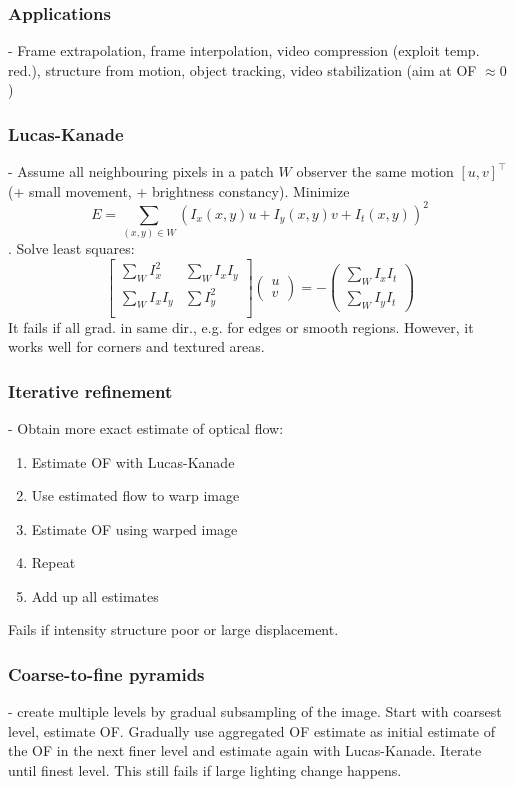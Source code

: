 \documentclass[a4paper,10pt]{article}
\begin{document}
\subsubsection{Applications} - Frame extrapolation, frame interpolation, video compression (exploit temp. red.), structure from motion, object tracking, video stabilization (aim at OF \( \approx 0 \))
\subsubsection{Lucas-Kanade} - Assume all neighbouring pixels in a patch \( W \) observer the same motion \( \left[ u,v \right]^\top \) (+ small movement, + brightness constancy). Minimize \[ E = \sum_{(x,y)\in W} (I_x(x,y)u + I_y(x,y)v + I_t(x,y))^2 \]. Solve least squares:
    \[
	\left[
	\begin{smallmatrix} 
	    \sum_W I^2_x & \sum_W I_x I_y \\
	    \sum_W I_x I_y & \sum I^2_y \\
	\end{smallmatrix}
	\right]
	\left(
	    \begin{smallmatrix}
		u \\ v
	    \end{smallmatrix}
	\right)
	= -
	\left(
	\begin{smallmatrix}
	    \sum_W I_x I_t \\
	    \sum_W I_y I_t
	\end{smallmatrix}
	\right)
    \] 
It fails if all grad. in same dir., e.g. for edges or smooth regions. However, it works well for corners and textured areas.
\subsubsection{Iterative refinement} - Obtain more exact estimate of optical flow:
    \begin{enumerate}
	\item Estimate OF with Lucas-Kanade
	\item Use estimated flow to warp image
	\item Estimate OF using warped image
	\item Repeat
	\item Add up all estimates
    \end{enumerate}
    Fails if intensity structure poor or large displacement.
\subsubsection{Coarse-to-fine pyramids} - create multiple levels by gradual subsampling of the image. Start with coarsest level, estimate OF. Gradually use aggregated OF estimate as initial estimate of the OF in the next finer level and estimate again with Lucas-Kanade. Iterate until finest level. This still fails if large lighting change happens.
\end{document}
